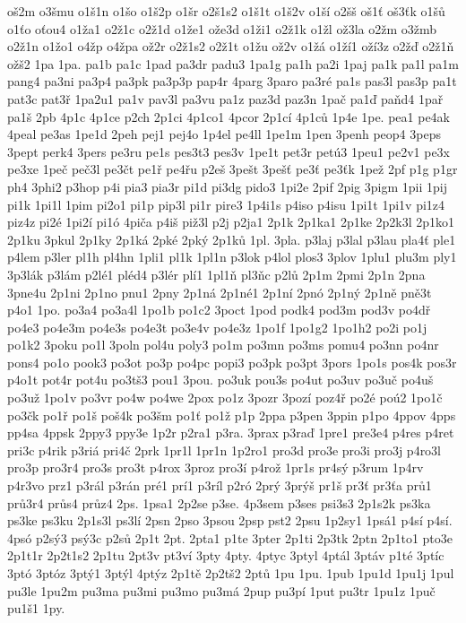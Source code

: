 {oš2m
o3šmu
o1š1n
o1šo
o1š2p
o1šr
o2š1s2
o1š1t
o1š2v
o1ší
o2šš
oš1ť
oš3ťk
o1šů
o1ťo
oťou4
o1ža1
o2ž1c
o2ž1d
o1že1
ože3d
o1ži1
o2ž1k
o1žl
ož3la
o2žm
o3žmb
o2ž1n
o1žo1
o4žp
o4žpa
ož2r
o2ž1s2
o2ž1t
o1žu
ož2v
o1žá
o1ží1
oží3z
o2žď
o2ž1ň
ožš2
1pa
1pa.
pa1b
pa1c
1pad
pa3dr
padu3
1pa1g
pa1h
pa2i
1paj
pa1k
pa1l
pa1m
pang4
pa3ni
pa3p4
pa3pk
pa3p3p
pap4r
4parg
3paro
pa3ré
pa1s
pas3l
pas3p
pa1t
pat3c
pat3ř
1pa2u1
pa1v
pav3l
pa3vu
pa1z
paz3d
paz3n
1pač
pa1ď
paňd4
1pař
pa1š
2pb
4p1c
4p1ce
p2ch
2p1ci
4p1co1
4pcor
2p1cí
4p1ců
1p4e
1pe.
pea1
pe4ak
4peal
pe3as
1pe1d
2peh
pej1
pej4o
1p4el
pe4ll
1pe1m
1pen
3penh
peop4
3peps
3pept
perk4
3pers
pe3ru
pe1s
pes3t3
pes3v
1pe1t
pet3r
petú3
1peu1
pe2v1
pe3x
pe3xe
1peč
peč3l
pe3čt
pe1ř
pe4řu
p2eš
3pešt
3pešť
pe3ť
pe3ťk
1pež
2pf
p1g
p1gr
ph4
3phi2
p3hop
p4i
pia3
pia3r
pi1d
pi3dg
pido3
1pi2e
2pif
2pig
3pigm
1pii
1pij
pi1k
1pi1l
1pim
pi2o1
pi1p
pip3l
pi1r
pire3
1p4i1s
p4iso
p4isu
1pi1t
1pi1v
pi1z4
piz4z
pi2é
1pi2í
pi1ó
4piča
p4iš
piž3l
p2j
p2ja1
2p1k
2p1ka1
2p1ke
2p2k3l
2p1ko1
2p1ku
3pkul
2p1ky
2p1ká
2pké
2pký
2p1ků
1pl.
3pla.
p3laj
p3lal
p3lau
pla4ť
ple1
p4lem
p3ler
pl1h
pl4hn
1pli1
pl1k
1pl1n
p3lok
p4lol
plos3
3plov
1plu1
plu3m
ply1
3p3lák
p3lám
p2lé1
pléd4
p3lér
plí1
1pl1ň
pl3ňc
p2lů
2p1m
2pmi
2p1n
2pna
3pne4u
2p1ni
2p1no
pnu1
2pny
2p1ná
2p1né1
2p1ní
2pnó
2p1ný
2p1ně
pně3t
p4o1
1po.
po3a4
po3a4l
1po1b
po1c2
3poct
1pod
podk4
pod3m
pod3v
po4dř
po4e3
po4e3m
po4e3s
po4e3t
po3e4v
po4e3z
1po1f
1po1g2
1po1h2
po2i
po1j
po1k2
3poku
po1l
3poln
pol4u
poly3
po1m
po3mn
po3ms
pomu4
po3nn
po4nr
pons4
po1o
pook3
po3ot
po3p
po4pc
popi3
po3pk
po3pt
3pors
1po1s
pos4k
pos3r
p4o1t
pot4r
pot4u
po3tš3
pou1
3pou.
po3uk
pou3s
po4ut
po3uv
po3uč
po4uš
po3už
1po1v
po3vr
po4w
po4we
2pox
po1z
3pozr
3pozí
poz4ř
po2é
poú2
1po1č
po3čk
po1ř
po1š
poš4k
po3šm
po1ť
po1ž
p1p
2ppa
p3pen
3ppin
p1po
4ppov
4pps
pp4sa
4ppsk
2ppy3
ppy3e
1p2r
p2ra1
p3ra.
3prax
p3raď
1pre1
pre3e4
p4res
p4ret
pri3c
p4rik
p3riá
pri4č
2prk
1pr1l
1pr1n
1p2ro1
pro3d
pro3e
pro3i
pro3j
p4ro3l
pro3p
pro3r4
pro3s
pro3t
p4rox
3proz
pro3í
p4rož
1pr1s
pr4sý
p3rum
1p4rv
p4r3vo
prz1
p3rál
p3rán
pré1
prí1
p3ríl
p2ró
2prý
3prýš
pr1š
pr3ť
pr3ťa
prů1
prů3r4
průs4
průz4
2ps.
1psa1
2p2se
p3se.
4p3sem
p3ses
psi3s3
2p1s2k
ps3ka
ps3ke
ps3ku
2p1s3l
ps3lí
2psn
2pso
3psou
2psp
pst2
2psu
1p2sy1
1psá1
p4sí
p4sí.
4psó
p2sý3
psý3c
p2sů
2p1t
2pt.
2pta1
p1te
3pter
2p1ti
2p3tk
2ptn
2p1to1
pto3e
2p1t1r
2p2t1s2
2p1tu
2pt3v
pt3ví
3pty
4pty.
4ptyc
3ptyl
4ptál
3ptáv
p1té
3ptíc
3ptó
3ptóz
3ptý1
3ptýl
4ptýz
2p1tě
2p2tš2
2ptů
1pu
1pu.
1pub
1pu1d
1pu1j
1pul
pu3le
1pu2m
pu3ma
pu3mi
pu3mo
pu3má
2pup
pu3pí
1put
pu3tr
1pu1z
1puč
pu1š1
1py.
}
